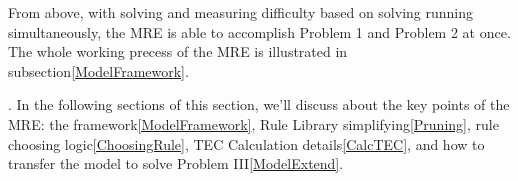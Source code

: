 \documentclass{article}
\begin{document}
From above, with solving and measuring difficulty based on solving running simultaneously, the MRE is able to accomplish Problem 1 and Problem 2 at once. The whole working precess of the MRE is illustrated in subsection\ref{ModelFramework}.

. In the following sections of this section, we'll discuss about the key points of the MRE: the framework\ref{ModelFramework}, Rule Library simplifying\ref{Pruning}, rule choosing logic\ref{ChoosingRule}, TEC Calculation details\ref{CalcTEC}, and how to transfer the model to solve Problem III\ref{ModelExtend}.





\end{document}
